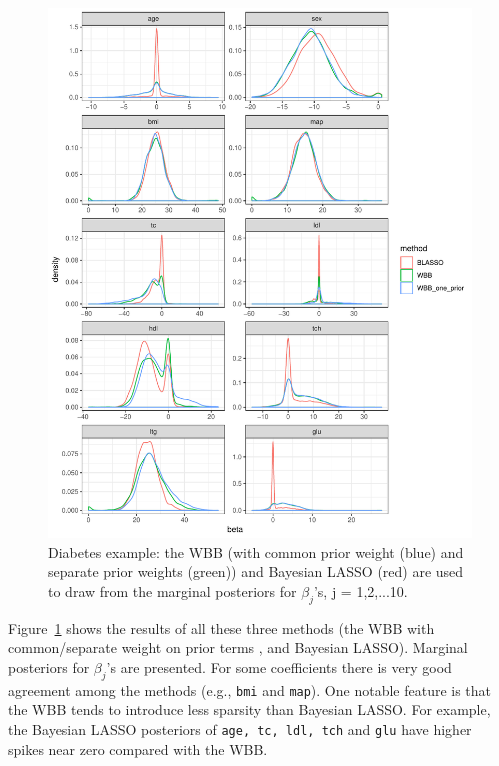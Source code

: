 \documentclass[12pt]{TD-CJS}
\begin{document}
\begin{figure}[!ht]
\centering 
\includegraphics[scale=0.7]{diabetes.pdf} 
\caption{Diabetes example: the WBB (with common prior weight
(blue) and separate prior weights (green)) and Bayesian LASSO (red) are used to draw from the marginal posteriors for $\beta_j$'s, j = 1,2,...10. }
\label{diabetes}
\end{figure}

Figure~\ref{diabetes} shows the results of all these three methods (the WBB with common/separate  weight on prior terms , and Bayesian LASSO). Marginal posteriors for $\beta_j$'s are presented. 
For some coefficients there is very good agreement among the methods (e.g., {\tt bmi} and {\tt map}).
 One notable feature is that the WBB tends to introduce less sparsity than Bayesian LASSO. For example, the Bayesian LASSO posteriors of {\tt age, tc, ldl, tch} and {\tt glu} have higher spikes near zero compared with the WBB.
\end{document}
